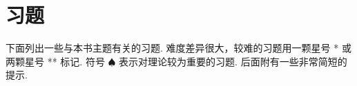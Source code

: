 \clearpage{}\section*{习题}\label{sec:exercises}
\setcounter{exercise}{0}\setcounter{footnote}{0}
下面列出一些与本书主题有关的习题. 难度差异很大，较难的习题用一颗星号 * 或两颗星号 ** 标记. 符号 $\spadesuit$ 表示对理论较为重要的习题. 后面附有一些非常简短的提示.


